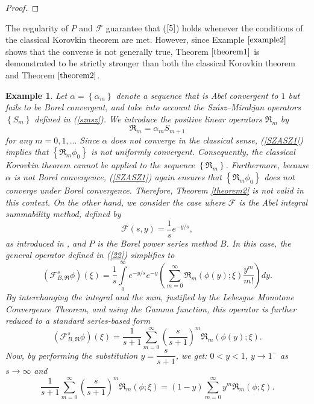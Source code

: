 \documentclass{amsart}
\theoremstyle{plain}
\newtheorem{example}{Example}
\numberwithin{equation}{section}
\begin{document}
\begin{proof}
\end{proof}

The regularity of $P$ and $\mathcal{F}$ guarantee that ($\ref{5}$) holds
whenever the conditions of the classical Korovkin theorem are met. However,
since Example $\ref{example2}$ shows that the converse is not generally true,
Theorem $\ref{theorem1}$ is demonstrated to be strictly stronger than both the
classical Korovkin theorem and Theorem $\ref{theorem2}$.

\begin{example}
\label{example2}Let $\alpha=\left \{  \alpha_{m}\right \}  $ denote a sequence
that is Abel convergent to $1$ but fails to be Borel convergent, and take into
account the Sz\'{a}sz--Mirakjan operators $\left \{  S_{m}\right \}  $ defined
in (\ref{szasz}). We introduce the positive linear operators $\Re_{m}$ by
\[
\Re_{m}=\alpha_{m}S_{m+1}%
\]
for any $m=0,1,...$ Since $\alpha$ does not converge in the classical sense,
(\ref{SZASZ1}) implies that $\left \{  \Re_{m}\phi_{0}\right \}  $ is not
uniformly convergent. Consequently, the classical Korovkin theorem cannot be
applied to the sequence $\left \{  \Re_{m}\right \}  $. Furthermore, because
$\alpha$ is not Borel convergence, (\ref{SZASZ1}) again ensures that $\left \{
\Re_{m}\phi_{0}\right \}  $ does not converge under Borel convergence.
Therefore, Theorem \ref{theorem2} is not valid in this context. On the other
hand, we consider the case where $\mathcal{F}$ is the Abel integral summability method, defined by
\[
\mathcal{F}(s,y)=\frac{1}{s}e^{-y/s},
\]
as introduced in \cite{connor}, and $P$ is the Borel power series method $B$.
In this case, the general operator defined in (\ref{22}) simplifies to
\[
(\mathcal{F}_{B,\Re}^{s}\phi)(\xi)=\frac{1}{s}{\displaystyle \int
\limits_{0}^{\infty}}e^{-y/s}e^{-y}\left(  \sum_{m=0}^{\infty}\Re_{m}%
(\phi(y);\xi)\frac{y^{m}}{m!}\right)  dy.
\]
By interchanging the integral and the sum, justified by the Lebesgue Monotone
Convergence Theorem, and using the Gamma function, this operator is further
reduced to a standard series-based form
\begin{equation}
(\mathcal{F}_{B,\Re}^{s}\phi)(\xi)=\frac{1}{s+1}\sum_{m=0}^{\infty}\left(
\frac{s}{s+1}\right)  ^{m}\Re_{m}(\phi(y);\xi).\label{24}%
\end{equation}
Now, by performing the substitution $y=\dfrac{s}{s+1}$, we get: $0<y<1$,
$y\rightarrow1^{-}$ as $s\rightarrow \infty$ and
\begin{equation}
\frac{1}{s+1}\sum_{m=0}^{\infty}\left(  \frac{s}{s+1}\right)  ^{m}\Re_{m}%
(\phi;\xi)=(1-y)\sum_{m=0}^{\infty}y^{m}\Re_{m}(\phi;\xi)\text{.}\label{7e}%

\end{equation}
\end{example}
\end{document}
